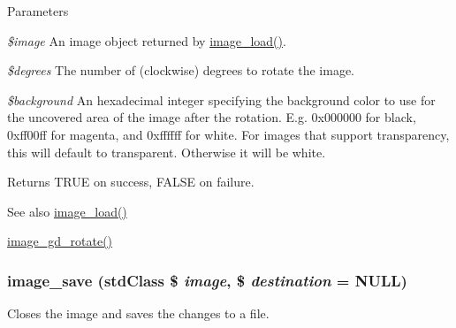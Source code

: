 \begin{DoxyParams}{Parameters}
\item[{\em \$image}]An image object returned by \hyperlink{group__image_ga96098e5b039dc3906a656fa889a04776}{image\_\-load()}. \item[{\em \$degrees}]The number of (clockwise) degrees to rotate the image. \item[{\em \$background}]An hexadecimal integer specifying the background color to use for the uncovered area of the image after the rotation. E.g. 0x000000 for black, 0xff00ff for magenta, and 0xffffff for white. For images that support transparency, this will default to transparent. Otherwise it will be white.\end{DoxyParams}
\begin{DoxyReturn}{Returns}
TRUE on success, FALSE on failure.
\end{DoxyReturn}
\begin{DoxySeeAlso}{See also}
\hyperlink{group__image_ga96098e5b039dc3906a656fa889a04776}{image\_\-load()} 

\hyperlink{group__image_gadfe1dec9bcb15c4b223acc64f35631d2}{image\_\-gd\_\-rotate()} 
\end{DoxySeeAlso}
\hypertarget{group__image_ga134df2e4d035378b52e866618c164f3b}{
\subsubsection[{image\_\-save}]{\setlength{\rightskip}{0pt plus 5cm}image\_\-save (stdClass \$ {\em image}, \/  \$ {\em destination} = {\ttfamily NULL})}}
\label{group__image_ga134df2e4d035378b52e866618c164f3b}
Closes the image and saves the changes to a file.


